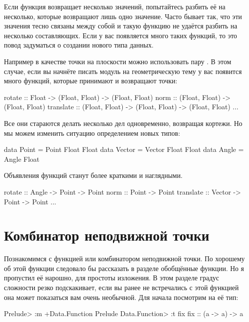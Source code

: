 Если функция возвращает несколько значений, попытайтесь
разбить её на несколько, которые возвращают лишь одно
значение. Часто бывает так, что эти значения тесно связаны
между собой и такую функцию не удаётся разбить на 
несколько составляющих. Если у вас появляется много 
таких функций, то это повод задуматься о создании нового
типа данных. 

Например в качестве точки на плоскости можно использовать
пару . В этом случае, если вы начнёте 
писать модуль на геометрическую тему у вас появится много функций,
которые принимают и возвращают точки:

\begin{code}
rotate      :: Float -> (Float, Float) -> (Float, Float)
norm        :: (Float, Float) -> (Float, Float)
translate   :: (Float, Float) -> (Float, Float) -> (Float, Float)
...    
\end{code}

Все они стараются делать несколько дел одновременно,
возвращая кортежи. Но мы можем изменить ситуацию 
определением новых типов:

\begin{code}
data Point  = Point  Float Float
data Vector = Vector Float Float
data Angle  = Angle  Float
\end{code}

Объявления функций станут более краткими и наглядными.

\begin{code}
rotate      :: Angle  -> Point -> Point
norm        :: Point  -> Point
translate   :: Vector -> Point -> Point
...    
\end{code}


\section{Комбинатор неподвижной точки}

Познакомимся с функцией  или комбинатором 
неподвижной точки. По хорошему об этой функции следовало
бы рассказать в разделе обобщённые функции. Но я пропустил
её нарошно, для простоты изложения. В этом разделе 
градус сложности резко подскакивает, если вы ранее
не встречались с этой функцией она может показаться
вам очень необычной. Для начала посмотрим на её тип:

\begin{code}
Prelude> :m +Data.Function
Prelude Data.Function> :t fix
fix :: (a -> a) -> a
\end{code}

